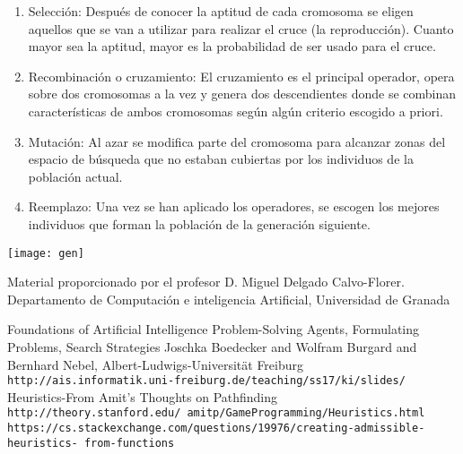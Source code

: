 \documentclass[12pt]{article}
\begin{document}
\begin{enumerate}
\item Selección: Después de conocer la aptitud de cada cromosoma se
  eligen aquellos que se van a utilizar para realizar el cruce (la
  reproducción). Cuanto mayor sea la aptitud, mayor es la probabilidad
  de ser usado para el cruce.

\item Recombinación o cruzamiento: El cruzamiento es el principal
  operador, opera sobre dos cromosomas a la vez y genera dos
  descendientes donde se combinan características de ambos cromosomas
  según algún criterio escogido a priori.

\item Mutación: Al azar se modifica parte del cromosoma para alcanzar
  zonas del espacio de búsqueda que no estaban cubiertas por los
  individuos de la población actual.

\item Reemplazo: Una vez se han aplicado los operadores, se escogen
  los mejores individuos que forman la población de la generación
  siguiente.
\end{enumerate}

\texttt{[image: gen]}

\begin{thebibliography}{9}
Material proporcionado por el profesor
D. Miguel Delgado Calvo-Florer. Departamento de Computación e inteligencia Artificial, Universidad de Granada
 
Foundations of Artificial Intelligence
Problem-Solving Agents, Formulating Problems, Search Strategies
Joschka Boedecker and Wolfram Burgard and Bernhard Nebel, Albert-Ludwigs-Universität Freiburg
\texttt{http://ais.informatik.uni-freiburg.de/teaching/ss17/ki/slides/}
  Heuristics-From Amit’s Thoughts on Pathfinding\\
  \texttt{http://theory.stanford.edu/~amitp/GameProgramming/Heuristics.html}
  \texttt{https://cs.stackexchange.com/questions/19976/creating-admissible-heuristics-
    from-functions}
\end{thebibliography}
\end{document}
